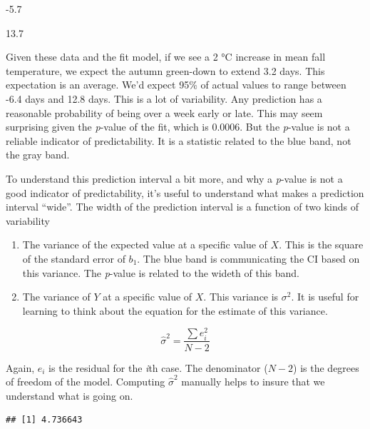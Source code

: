 \documentclass[]{book}
\newenvironment{Shaded}{\begin{snugshade}}{\end{snugshade}}
\newcommand{\CommentTok}[1]{\textcolor[rgb]{0.56,0.35,0.01}{\textit{#1}}}
\newcommand{\KeywordTok}[1]{\textcolor[rgb]{0.13,0.29,0.53}{\textbf{#1}}}
\newcommand{\NormalTok}[1]{#1}
\newcommand{\OperatorTok}[1]{\textcolor[rgb]{0.81,0.36,0.00}{\textbf{#1}}}
\providecommand{\tightlist}{%
  \setlength{\itemsep}{0pt}\setlength{\parskip}{0pt}}
\begin{document}
-5.7

13.7

Given these data and the fit model, if we see a 2 °C increase in mean fall temperature, we expect the autumn green-down to extend 3.2 days. This expectation is an average. We'd expect 95\% of actual values to range between -6.4 days and 12.8 days. This is a lot of variability. Any prediction has a reasonable probability of being over a week early or late. This may seem surprising given the \emph{p}-value of the fit, which is 0.0006. But the \emph{p}-value is not a reliable indicator of predictability. It is a statistic related to the blue band, not the gray band.

To understand this prediction interval a bit more, and why a \emph{p}-value is not a good indicator of predictability, it's useful to understand what makes a prediction interval ``wide''. The width of the prediction interval is a function of two kinds of variability

\begin{enumerate}
\def\labelenumi{\arabic{enumi}.}
\tightlist
\item
  The variance of the expected value at a specific value of \(X\). This is the square of the standard error of \(b_1\). The blue band is communicating the CI based on this variance. The \emph{p}-value is related to the wideth of this band.
\item
  The variance of \(Y\) at a specific value of \(X\). This variance is \(\sigma^2\). It is useful for learning to think about the equation for the estimate of this variance.
\end{enumerate}

\begin{equation}
\hat\sigma^2 = \frac{\sum{e_i^2}}{N-2}
\end{equation}

Again, \(e_i\) is the residual for the \emph{i}th case. The denominator (\(N-2\)) is the degrees of freedom of the model. Computing \(\hat\sigma^2\) manually helps to insure that we understand what is going on.

\begin{Shaded}
\end{Shaded}

\begin{verbatim}
## [1] 4.736643
\end{verbatim}
\end{document}

